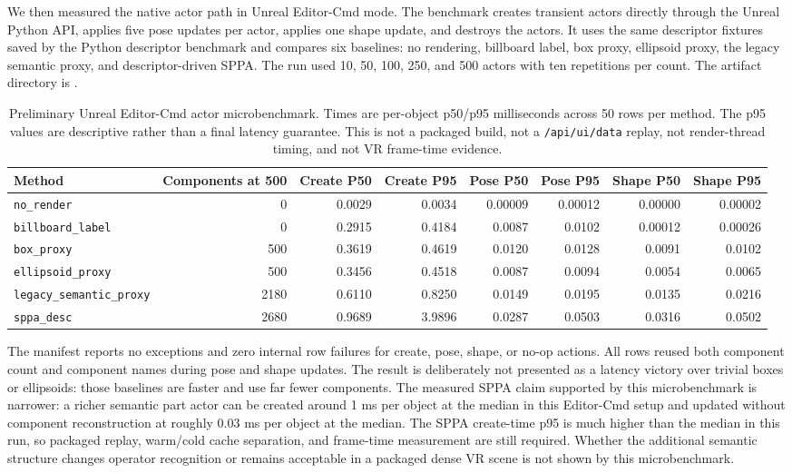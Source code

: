 ﻿\documentclass[11pt,a4paper]{article}
\begin{document}
We then measured the native actor path in Unreal Editor-Cmd mode. The benchmark
creates transient actors directly through the Unreal Python API, applies five
pose updates per actor, applies one shape update, and destroys the actors. It
uses the same descriptor fixtures saved by the Python descriptor benchmark and
compares six baselines: no rendering, billboard label, box proxy, ellipsoid
proxy, the legacy semantic proxy, and descriptor-driven SPPA. The run used
10, 50, 100, 250, and 500 actors with ten repetitions per count. The artifact
directory is
.

\begin{table}[h]
\centering
\scriptsize
\setlength{\tabcolsep}{3pt}
\caption{Preliminary Unreal Editor-Cmd actor microbenchmark. Times are
per-object p50/p95 milliseconds across 50 rows per method. The p95 values are
descriptive rather than a final latency guarantee. This is not a packaged build,
not a \texttt{/api/ui/data} replay, not render-thread timing, and not VR
frame-time evidence.}
\label{tab:unreal-actor-microbenchmark}
\begin{tabular}{@{}lrrrrrrr@{}}
\toprule
Method & Components at 500 & Create P50 & Create P95 & Pose P50 & Pose P95 & Shape P50 & Shape P95 \\
\midrule
\texttt{no\_render} & 0 & 0.0029 & 0.0034 & 0.00009 & 0.00012 & 0.00000 & 0.00002 \\
\texttt{billboard\_label} & 0 & 0.2915 & 0.4184 & 0.0087 & 0.0102 & 0.00012 & 0.00026 \\
\texttt{box\_proxy} & 500 & 0.3619 & 0.4619 & 0.0120 & 0.0128 & 0.0091 & 0.0102 \\
\texttt{ellipsoid\_proxy} & 500 & 0.3456 & 0.4518 & 0.0087 & 0.0094 & 0.0054 & 0.0065 \\
\texttt{legacy\_semantic\_proxy} & 2180 & 0.6110 & 0.8250 & 0.0149 & 0.0195 & 0.0135 & 0.0216 \\
\texttt{sppa\_desc} & 2680 & 0.9689 & 3.9896 & 0.0287 & 0.0503 & 0.0316 & 0.0502 \\
\bottomrule
\end{tabular}
\end{table}

The manifest reports no exceptions and zero internal row failures for create,
pose, shape, or no-op actions. All rows reused both component count and component
names during pose and shape updates. The result is deliberately not presented as
a latency victory over trivial boxes or ellipsoids: those baselines are faster
and use far fewer components. The measured SPPA claim supported by this
microbenchmark is narrower: a richer semantic part actor can be created around
1 ms per object at the median in this Editor-Cmd setup and updated without
component reconstruction at roughly 0.03 ms per object at the median. The SPPA
create-time p95 is much higher than the median in this run, so packaged replay,
warm/cold cache separation, and frame-time measurement are still required.
Whether the additional semantic structure changes operator recognition or
remains acceptable in a packaged dense VR scene is not shown by this
microbenchmark.
\end{document}
